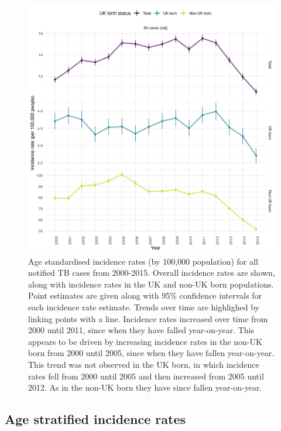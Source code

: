 \documentclass[11pt,twoside]{bristolthesis}
\begin{document}
  \newpage
  \begin{figure}
  
  {\centering \includegraphics[width=0.8\linewidth,]{chapters/tb-epi-england/figures/plot-overall-inc-rates} 
  
  }
  
  \caption[Age standardised (adjusted) incidence rates (by 100,000 population) for all notified TB cases from 2000-2015.]{Age standardised incidence rates (by 100,000 population) for all notified TB cases from 2000-2015. Overall incidence rates are shown, along with incidence rates in the UK and non-UK born populations. Point estimates are given along with 95\% confidence intervals for each incidence rate estimate. Trends over time are highlighed by linking points with a line. Incidence rates increased over time from 2000 until 2011, since when they have falled year-on-year. This appears to be driven by increasing incidence rates in the non-UK born from 2000 until 2005, since when they have fallen year-on-year. This trend was not observed in the UK born, in which incidence rates fell from 2000 until 2005 and then increased from 2005 until 2012. As in the non-UK born they have since fallen year-on-year.}\label{fig:plot-overall-inc-rates}
  \end{figure}
  \hypertarget{age-stratified-incidence-rates}{%
  \subsection{Age stratified incidence rates}\label{age-stratified-incidence-rates}}
  
\end{document}

